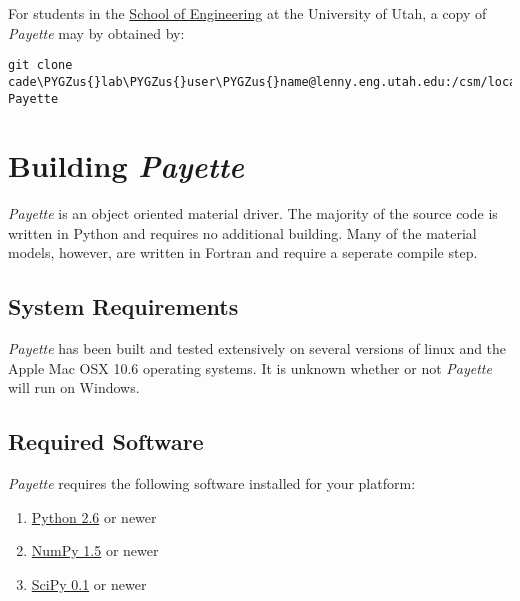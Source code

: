 \documentclass[letterpaper,10pt,english]{sphinxmanual}
\def\PYGZus{\char`\_}
\begin{document}
For students in the \href{http://www.coe.utah.edu}{School of Engineering} at the
University of Utah, a copy of \emph{Payette} may by obtained by:

\begin{Verbatim}[commandchars=\\\{\}]
git clone cade\PYGZus{}lab\PYGZus{}user\PYGZus{}name@lenny.eng.utah.edu:/csm/local/git/Payette.git Payette
\end{Verbatim}


\chapter{Building \emph{Payette}}
\label{Files/building:building-payette}\label{Files/building::doc}
\emph{Payette} is an object oriented material driver. The majority of the source code
is written in Python and requires no additional building. Many of the material
models, however, are written in Fortran and require a seperate compile step.


\section{System Requirements}
\label{Files/building:system-requirements}
\emph{Payette} has been built and tested extensively on several versions of linux and
the Apple Mac OSX 10.6 operating systems. It is unknown whether or not \emph{Payette}
will run on Windows.


\section{Required Software}
\label{Files/building:required-software}
\emph{Payette} requires the following software installed for your platform:
\begin{enumerate}
\item {} 
\href{http://www.python.org/}{Python 2.6} or newer

\item {} 
\href{http://www.numpy.org/}{NumPy 1.5} or newer

\item {} 
\href{http://www.scipy.org/}{SciPy 0.1} or newer

\end{enumerate}
\end{document}
